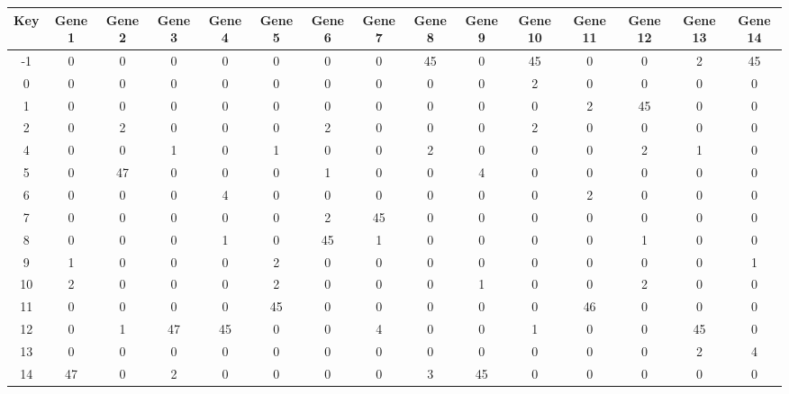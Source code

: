 \begin{tabular}{|c|c|c|c|c|c|c|c|c|c|c|c|c|c|c|}
\hline
Key & Gene 1 & Gene 2 & Gene 3 & Gene 4 & Gene 5 & Gene 6 & Gene 7 & Gene 8 & Gene 9 & Gene 10 & Gene 11 & Gene 12 & Gene 13 & Gene 14 \\
\hline
-1 & 0 & 0 & 0 & 0 & 0 & 0 & 0 & 45 & 0 & 45 & 0 & 0 & 2 & 45 \\
0 & 0 & 0 & 0 & 0 & 0 & 0 & 0 & 0 & 0 & 2 & 0 & 0 & 0 & 0 \\
1 & 0 & 0 & 0 & 0 & 0 & 0 & 0 & 0 & 0 & 0 & 2 & 45 & 0 & 0 \\
2 & 0 & 2 & 0 & 0 & 0 & 2 & 0 & 0 & 0 & 2 & 0 & 0 & 0 & 0 \\
4 & 0 & 0 & 1 & 0 & 1 & 0 & 0 & 2 & 0 & 0 & 0 & 2 & 1 & 0 \\
5 & 0 & 47 & 0 & 0 & 0 & 1 & 0 & 0 & 4 & 0 & 0 & 0 & 0 & 0 \\
6 & 0 & 0 & 0 & 4 & 0 & 0 & 0 & 0 & 0 & 0 & 2 & 0 & 0 & 0 \\
7 & 0 & 0 & 0 & 0 & 0 & 2 & 45 & 0 & 0 & 0 & 0 & 0 & 0 & 0 \\
8 & 0 & 0 & 0 & 1 & 0 & 45 & 1 & 0 & 0 & 0 & 0 & 1 & 0 & 0 \\
9 & 1 & 0 & 0 & 0 & 2 & 0 & 0 & 0 & 0 & 0 & 0 & 0 & 0 & 1 \\
10 & 2 & 0 & 0 & 0 & 2 & 0 & 0 & 0 & 1 & 0 & 0 & 2 & 0 & 0 \\
11 & 0 & 0 & 0 & 0 & 45 & 0 & 0 & 0 & 0 & 0 & 46 & 0 & 0 & 0 \\
12 & 0 & 1 & 47 & 45 & 0 & 0 & 4 & 0 & 0 & 1 & 0 & 0 & 45 & 0 \\
13 & 0 & 0 & 0 & 0 & 0 & 0 & 0 & 0 & 0 & 0 & 0 & 0 & 2 & 4 \\
14 & 47 & 0 & 2 & 0 & 0 & 0 & 0 & 3 & 45 & 0 & 0 & 0 & 0 & 0 \\
\hline
\end{tabular}